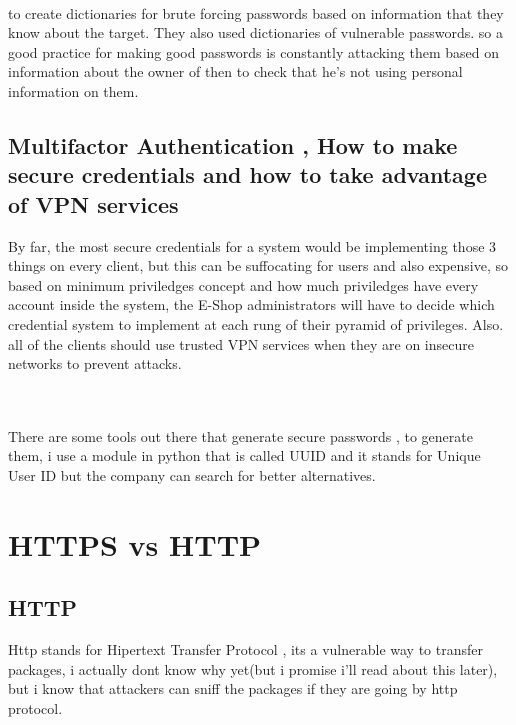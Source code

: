 \documentclass[10pt,a4paper]{article} %
\begin{document}
            \\ 
            to create dictionaries for brute forcing passwords based on information that they know about the
            target. They also used dictionaries of vulnerable passwords. so a
            good practice for making good passwords is constantly
            attacking them based on information about the owner of then to
            check
            that he's not using personal information on them.

        \subsection{Multifactor Authentication , How to make secure credentials and how to take advantage of VPN services}
            By far, the most secure credentials for a system would be
            implementing those 3 things on every client, but this can be
            suffocating for users and also expensive, so based on minimum
            priviledges concept and how much priviledges have every account
            inside the system, the E-Shop administrators will have to decide
            which credential system to implement at each rung of their pyramid
            of privileges. Also. all of the clients should use trusted VPN
            services when they are on insecure networks to prevent attacks.
            
            
            \\ 
            \\ There are some tools out there that generate secure passwords ,
            to generate them, i use a module in python that is called UUID and
            it stands for Unique User ID but the company can search for better
            alternatives.

         \section{HTTPS vs HTTP}
             \subsection{HTTP}
                 Http stands for Hipertext Transfer Protocol , its a vulnerable
                 way to transfer packages, i actually dont know why yet(but i
                 promise i'll read about this later), but i
                 know that attackers can sniff the packages if they are going
                 by http protocol.
\end{document}
